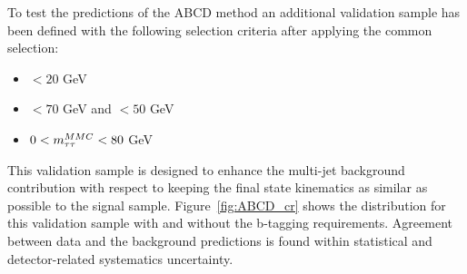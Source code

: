 To test the predictions of the ABCD method  an additional validation sample has been defined with the following selection criteria after
applying the common selection:
\begin{itemize}
\item \MET $< 20$ GeV
\item \Ht $< 70$ GeV and \SumLtMET$ < 50$ GeV
\item $0 < m_{\tau\tau}^{MMC} < 80$ GeV  	 
\end{itemize}
This validation sample is designed to enhance the multi-jet background contribution with respect to \Ztautau keeping the final 
state kinematics as similar as possible to the signal sample.
Figure~\ref{fig:ABCD_cr} shows the \mmc distribution for this validation sample with and without the  b-tagging requirements.
Agreement between data and the background predictions is found within statistical and detector-related systematics uncertainty. 







